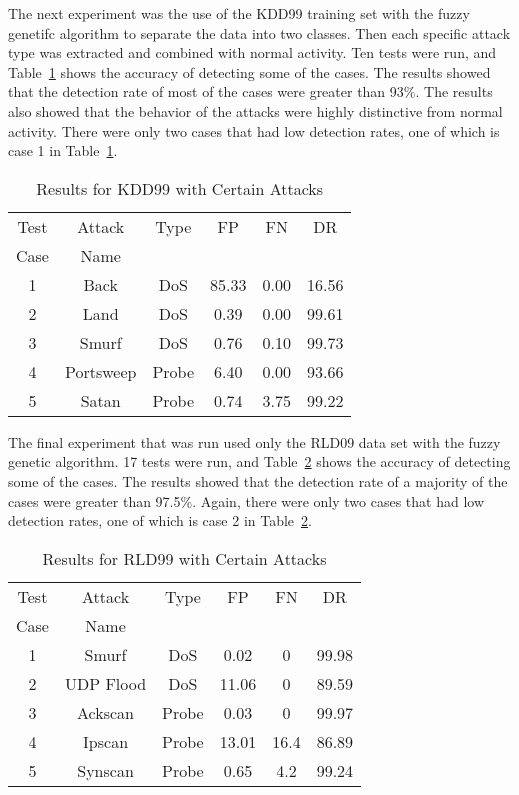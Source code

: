 \documentclass{sig-alternate}
\begin{document}
The next experiment was the use of the KDD99 training set with the fuzzy genetifc algorithm to separate the data into two classes. Then each specific attack type was extracted and combined with normal activity. Ten tests were run, and Table~\ref{tab:kddAttacks} shows the accuracy of detecting some of the cases. The results showed that the detection rate of most of the cases were greater than 93\%. The results also showed that the behavior of the attacks were highly distinctive from normal activity. There were only two cases that had low detection rates, one of which is case 1 in Table~\ref{tab:kddAttacks}.

\begin{table}
\caption{Results for KDD99 with Certain Attacks}
\begin{tabular}{|cccccc|} \hline
Test & Attack & Type & FP & FN & DR\\
Case & Name   &&&&\\ \hline
1 & Back & DoS & 85.33 & 0.00 & 16.56\\
2 & Land & DoS & 0.39 & 0.00 & 99.61\\
3 & Smurf & DoS & 0.76 & 0.10 & 99.73\\
4 & Portsweep & Probe & 6.40 & 0.00 & 93.66\\
5 & Satan & Probe & 0.74 & 3.75 & 99.22\\
\hline\end{tabular}
\label{tab:kddAttacks}
\end{table}

The final experiment that was run used only the RLD09 data set with the fuzzy genetic algorithm. 17 tests were run, and Table~\ref{tab:rldAttacks} shows the accuracy of detecting some of the cases. The results showed that the detection rate of a majority of the cases were greater than 97.5\%. Again, there were only two cases that had low detection rates, one of which is case 2 in Table~\ref{tab:rldAttacks}.

\begin{table}
\caption{Results for RLD99 with Certain Attacks}
\begin{tabular}{|cccccc|} \hline
Test & Attack & Type & FP & FN & DR\\
Case & Name   &&&&\\ \hline
1 & Smurf & DoS & 0.02 & 0 & 99.98\\
2 & UDP Flood & DoS & 11.06 & 0 & 89.59\\
3 & Ackscan & Probe & 0.03 & 0 & 99.97\\
4 & Ipscan & Probe & 13.01 & 16.4 & 86.89\\
5 & Synscan & Probe & 0.65 & 4.2 & 99.24\\
\hline\end{tabular}
\label{tab:rldAttacks}
\end{table}
\end{document}
